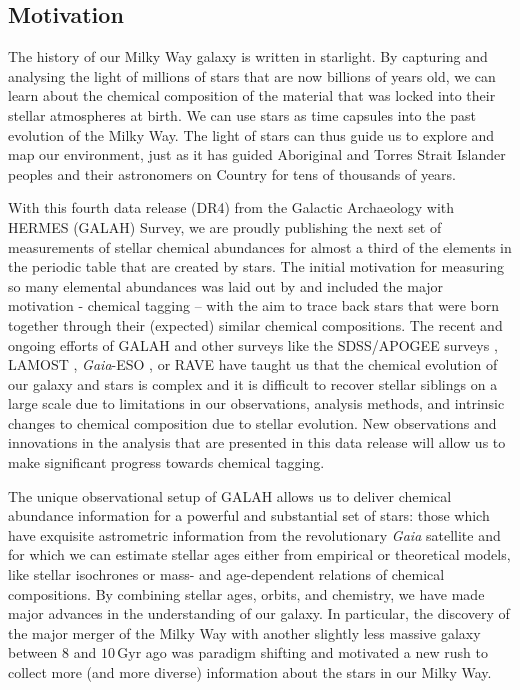 \documentclass[
  journal=pasa,
  manuscript=research-paper, %
  year=2024,
  volume=37
]{cup-journal}
\newcommand{\Gaia}{\textit{Gaia}\xspace}
\begin{document}
\subsection{Motivation} \label{sec:motivation}

The history of our Milky Way galaxy is written in starlight. By capturing and analysing the light of millions of stars that are now billions of years old, we can learn about the chemical composition of the material that was locked into their stellar atmospheres at birth. We can use stars as time capsules into the past evolution of the Milky Way. The light of stars can thus guide us to explore and map our environment, just as it has guided Aboriginal and Torres Strait Islander peoples and their astronomers on Country for tens of thousands of years.

With this fourth data release (DR4) from the Galactic Archaeology with HERMES (GALAH) Survey, we are proudly publishing the next set of measurements of stellar chemical abundances for almost a third of the elements in the periodic table that are created by stars. The initial motivation for measuring so many elemental abundances was laid out by \citet{DeSilva2015} and included the major motivation - chemical tagging -- with the aim to trace back stars that were born together through their (expected) similar chemical compositions. The recent and ongoing efforts of GALAH and other surveys like the SDSS/APOGEE surveys \citep[e.g.][]{SDSSDR17, Kollmeier2017}, LAMOST \citep{Zhao2012}, \Gaia-ESO \citep{Gilmore2022,Hourihane2023}, or RAVE \citep{Steinmetz2020a} have taught us that the chemical evolution of our galaxy and stars is complex and it is difficult to recover stellar siblings on a large scale due to limitations in our observations, analysis methods, and intrinsic changes to chemical composition due to stellar evolution. New observations and innovations in the analysis that are presented in this data release will allow us to make significant progress towards chemical tagging.

The unique observational setup of GALAH allows us to deliver chemical abundance information for a powerful and substantial set of stars: those which have exquisite astrometric information from the revolutionary \Gaia satellite \citep{Gaia-Collaboration2016} and for which we can estimate stellar ages either from empirical or theoretical models, like stellar isochrones or mass- and age-dependent relations of chemical compositions. By combining stellar ages, orbits, and chemistry, we have made major advances in the understanding of our galaxy. In particular, the discovery of the major merger of the Milky Way with another slightly less massive galaxy between 8 and $10\,\mathrm{Gyr}$ ago \citep{Belokurov2018, Helmi2018} was paradigm shifting and motivated a new rush to collect more (and more diverse) information about the stars in our Milky Way.
\end{document}
